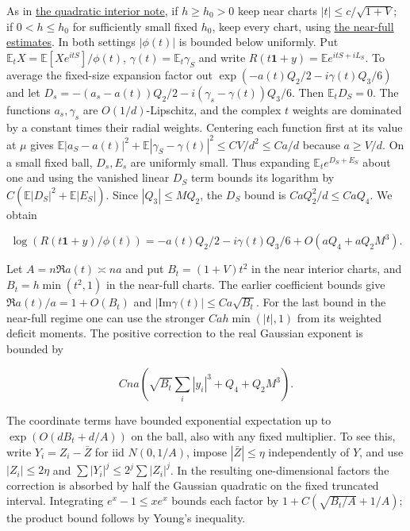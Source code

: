 As in \href{https://github.com/ProgramComputer/open-math-research/blob/4fb624ba937a8eecc1361a6066185cd81ab7b172/topics/balanced-arrays/quadratic/very-tall-quadratic-interior-saddle.md}{the quadratic interior note}, if $h\ge h_0>0$ keep near charts $|t|\le c/\sqrt{1+V}$; if $0<h\le h_0$ for sufficiently small fixed $h_0$, keep every chart, using \href{https://github.com/ProgramComputer/open-math-research/blob/4fb624ba937a8eecc1361a6066185cd81ab7b172/topics/balanced-arrays/quadratic/near-full-all-angular-signs.md}{the near-full estimates}. In both settings $|\phi(t)|$ is bounded below uniformly. Put $\mathbb E_t X=\mathbb E[Xe^{itS}]/\phi(t)$, $\gamma(t)=\mathbb E_t\gamma_S$ and write $R(t\mathbf1+y)=\mathbb E e^{itS+iL_S}$. To average the fixed-size expansion factor out $\exp(-a(t)Q_2/2-i\gamma(t)Q_3/6)$ and let $D_s=-(a_s-a(t))Q_2/2-i(\gamma_s-\gamma(t))Q_3/6$. Then $\mathbb E_t D_S=0$. The functions $a_s,\gamma_s$ are $O(1/d)$-Lipschitz, and the complex $t$ weights are dominated by a constant times their radial weights. Centering each function first at its value at $\mu$ gives
$\mathbb E|a_S-a(t)|^2+\mathbb E|\gamma_S-\gamma(t)|^2\le C V/d^2\le Ca/d$ because $a\ge V/d$.
On a small fixed ball, $D_s,E_s$ are uniformly small. Thus expanding $\mathbb E_t e^{D_S+E_S}$ about one and using the vanished linear $D_S$ term bounds its logarithm by $C(\mathbb E|D_S|^2+\mathbb E|E_S|)$. Since $|Q_3|\le M Q_2$, the $D_S$ bound is $CaQ_2^2/d\le CaQ_4$. We obtain

\begin{equation*}
\log(R(t\mathbf1+y)/\phi(t))
=-a(t)Q_2/2-i\gamma(t)Q_3/6+O\!\left(aQ_4+aQ_2M^3\right).
\end{equation*}

Let $A=n\Re a(t)\asymp na$ and put $B_t=(1+V)t^2$ in the near interior charts, and $B_t=h\min(t^2,1)$ in the near-full charts. The earlier coefficient bounds give $\Re a(t)/a=1+O(B_t)$ and $|\mathrm{Im}\gamma(t)|\le Ca\sqrt{B_t}$. For the last bound in the near-full regime one can use the stronger $Ca h\min(|t|,1)$ from its weighted deficit moments. The positive correction to the real Gaussian exponent is bounded by

\begin{equation*}
Cna\left(\sqrt{B_t}\sum_i |y_i|^3+Q_4+Q_2M^3\right).
\end{equation*}

The coordinate terms have bounded exponential expectation up to $\exp(O(d B_t+d/A))$ on the ball, also with any fixed multiplier. To see this, write $Y_i=Z_i-\bar Z$ for iid $N(0,1/A)$, impose $|\bar Z|\le\eta$ independently of $Y$, and use $|Z_i|\le2\eta$ and $\sum |Y_i|^j\le2^j\sum|Z_i|^j$. In the resulting one-dimensional factors the correction is absorbed by half the Gaussian quadratic on the fixed truncated interval. Integrating $e^x-1\le x e^x$ bounds each factor by $1+C(\sqrt{B_t/A}+1/A)$; the product bound follows by Young's inequality.

